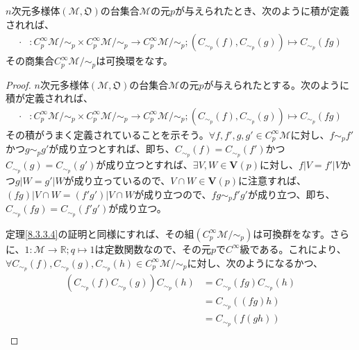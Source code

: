 \documentclass[dvipdfmx]{jsarticle}
\begin{document}
\begin{thm}\label{8.3.3.5}
  $n$次元多様体$\left(\mathcal{M},\mathfrak{O}\right)$の台集合$\mathcal{M}$の元$p$が与えられたとき、次のように積が定義されれば、
  \begin{align*}
    \cdot &:C^\infty_p \mathcal{M} /\sim_p \times C^\infty_p \mathcal{M} /\sim_p \rightarrow C^\infty_p \mathcal{M} /\sim_p ; \left( C_{\sim_p} \left(f\right),C_{\sim_p} \left(g\right)\right) \mapsto C_{\sim_p} \left(fg\right) 
  \end{align*}
  その商集合$C^\infty_p \mathcal{M} /\sim_p $は可換環をなす。
\end{thm}
\begin{proof}
  $n$次元多様体$\left(\mathcal{M},\mathfrak{O}\right)$の台集合$\mathcal{M}$の元$p$が与えられたとする。次のように積が定義されれば、
  \begin{align*}
    \cdot &:C^\infty_p \mathcal{M} /\sim_p \times C^\infty_p \mathcal{M} /\sim_p \rightarrow C^\infty_p \mathcal{M} /\sim_p ; \left( C_{\sim_p} \left(f\right),C_{\sim_p} \left(g\right)\right) \mapsto C_{\sim_p} \left(fg\right) 
  \end{align*}  
  その積がうまく定義されていることを示そう。$\forall f,f',g,g' \in C^\infty_p \mathcal{M}$に対し、$f\sim_p f'$かつ$g\sim_p g'$が成り立つとすれば、即ち、$C_{\sim_p} \left(f\right) =C_{\sim_p } \left(f'\right)$かつ$C_{\sim_p} \left(g\right) =C_{\sim_p } \left(g'\right)$が成り立つとすれば、$\exists V,W\in \mathbf{V} \left(p\right)$に対し、$f|V=f'|V$かつ$g|W=g'|W$が成り立っているので、$V\cap W\in \mathbf{V} \left(p\right)$に注意すれば、$\left(fg\right)|V\cap W=\left(f'g'\right)|V\cap W$が成り立つので、$fg\sim_p f'g'$が成り立つ、即ち、$C_{\sim_p } \left(fg\right) =C_{\sim_p } \left(f'g'\right)$が成り立つ。\par
  定理\ref{8.3.3.4}の証明と同様にすれば、その組$\left(C^\infty_p \mathcal{M}/\sim_p \right)$は可換群をなす。さらに、$1:\mathcal{M} \rightarrow \mathbb{R} ;q\mapsto 1$は定数関数なので、その元$p$で$C^\infty $級である。これにより、$\forall C_{\sim_p}\left(f\right),C_{\sim_p}\left(g\right),C_{\sim_p}\left(h\right)\in C^\infty_p \mathcal{M}/\sim_p$に対し、次のようになるかつ、
  \begin{align*}
    \left(C_{\sim_p}\left(f\right)C_{\sim_p}\left(g\right)\right)C_{\sim_p}\left(h\right)&=C_{\sim_p}\left(fg\right)C_{\sim_p}\left(h\right)\\
    &=C_{\sim_p}\left(\left(fg\right)h\right)\\
    &=C_{\sim_p}\left(f\left(gh\right)\right)\\

\end{align*}
\end{proof}
\end{document}
